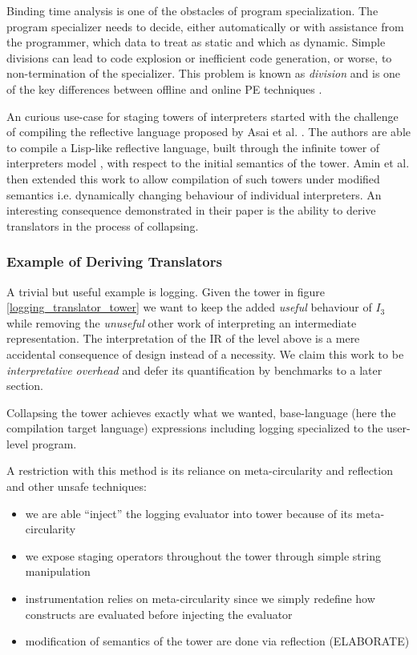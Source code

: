 \documentclass{article}
\theoremstyle{definition}
\begin{document}
Binding time analysis is one of the obstacles of program specialization. The program specializer needs to decide, either automatically or with assistance from the programmer, which data to treat as static and which as dynamic. Simple divisions
can lead to code explosion or inefficient code generation, or worse, to non-termination of the specializer. This problem is known as \textit{division} and is one of the key differences between offline and online PE techniques \cite{jones1993partial}.

An curious use-case for staging towers of interpreters started with the challenge of compiling the reflective language proposed by Asai et al. \cite{asai1997partial, asai2015compiling}. The authors are able to compile a Lisp-like reflective language, built through
the infinite tower of interpreters model \cite{smith1982reflection,wand1988mystery,danvy1988intensions}, with respect to the initial semantics of the tower. Amin et al. \cite{amin2017collapsing} then extended this work to allow compilation of such towers
under modified semantics i.e. dynamically changing behaviour of individual interpreters. An interesting consequence demonstrated in their paper is the ability to derive translators in the process of collapsing.

\subsubsection{Example of Deriving Translators}
A trivial but useful example is logging. Given the tower in figure \ref{logging_translator_tower} we want to keep the added \textit{useful} behaviour of $I_3$ while removing the \textit{unuseful} other work of interpreting an intermediate representation. The interpretation
of the IR of the level above is a mere accidental consequence of design instead of a necessity. We claim this work to be \textit{interpretative overhead} and defer its quantification by benchmarks to a later section.

Collapsing the tower achieves exactly what we wanted, base-language (here the compilation target language) expressions including logging specialized to the user-level program.

A restriction with this method is its reliance on meta-circularity and reflection and other unsafe techniques:
\begin{itemize}
	\item we are able ``inject'' the logging evaluator into tower because of its meta-circularity
	\item we expose staging operators throughout the tower through simple string manipulation
	\item instrumentation relies on meta-circularity since we simply redefine how constructs are evaluated before injecting the evaluator
	\item modification of semantics of the tower are done via reflection (ELABORATE)
\end{itemize}
\end{document}
